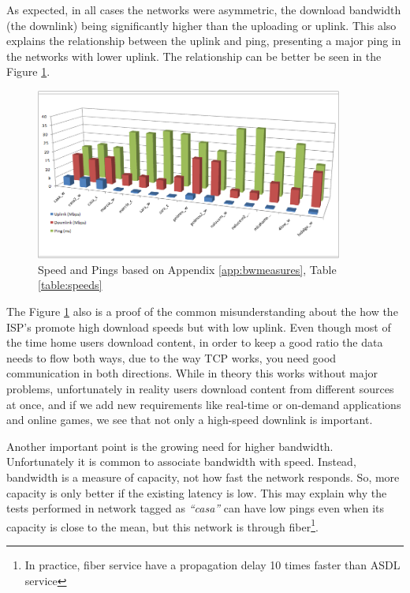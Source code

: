 As expected, in all cases the networks were asymmetric, 
the download bandwidth (the downlink) being significantly higher than the uploading
or uplink. This also explains the relationship between the uplink and ping,
presenting a major ping in the networks with lower uplink. The relationship
can be better be seen in the Figure \ref{fig:speeds}.

\begin{figure}[ht]
\centering
    \includegraphics[width=0.9\textwidth]{img/speed_graph}
\caption{Speed and Pings based on Appendix \ref{app:bwmeasures}, Table \ref{table:speeds}}
\label{fig:speeds}
\end{figure}%

The Figure \ref{fig:speeds} also is a proof of the common misunderstanding
about the how the ISP's promote high download speeds but with low uplink. Even
though most of the time home users download content, in order to keep a good
ratio the data needs to flow both ways, due to the way TCP
works, you need good communication in both directions. While in theory this
works without major problems, unfortunately in reality users download content
from different sources at once, and if we add new requirements like real-time  or on-demand applications and online games, we see that not only a
high-speed downlink is important.

Another important point is the growing need for higher bandwidth.
Unfortunately it is common to associate bandwidth with speed. Instead,
bandwidth is a measure of capacity, not how fast the network responds. So,
more capacity is only better if the existing latency is low. This may
explain why the tests performed in network tagged as \emph{``casa''} can have low pings
even when its capacity is close to the mean, but this network is through
fiber\footnote{In practice, fiber service have a propagation delay 10 times
faster than ASDL service}.

